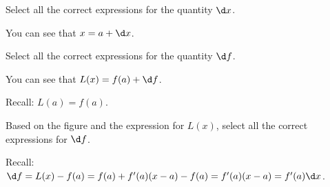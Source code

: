 \documentclass{ximera}
\begin{document}
\begin{question}
  Select all the correct expressions for the quantity $\d x$.
   \begin{hint}
     You can see that $x=a+\d x$.
    \end{hint}
    \begin{selectAll}
    \end{selectAll}
   
  \end{question}
  \begin{question}
  Select all the correct expressions for the quantity $\d f$.
   \begin{hint}
     You can see that $L(x)=f(a)+\d f$.
    \end{hint}
      \begin{hint}
    Recall: $L(a)=f(a)$.
    \end{hint}
    \begin{selectAll}
         
    \end{selectAll}
   
  \end{question}

 \begin{question}
Based on  the figure and the expression for $L(x)$, select all the correct expressions for $\d f$.
 \begin{hint}
    Recall: $\d f=L(x)-f(a)=f(a)+f'(a)(x-a)-f(a)=f'(a)(x-a)=f'(a)\d x$.
    \end{hint}
      \begin{selectAll}
      \end{selectAll}
  \end{question}
  
\end{document}

